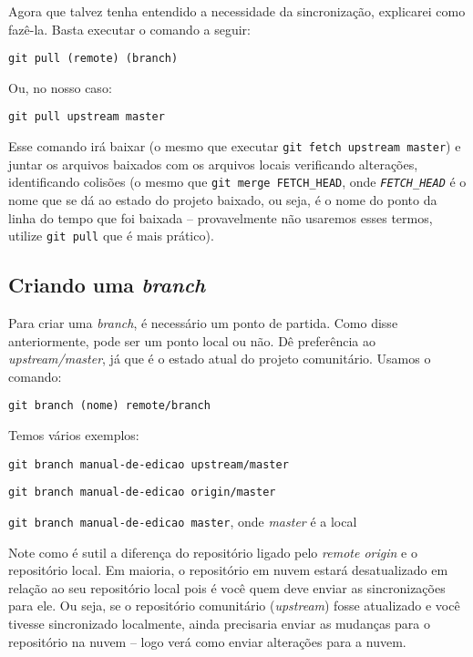 \documentclass[a4paper,oneside,10pt]{memoir}
\begin{document}
Agora que talvez tenha entendido a necessidade da sincronização, explicarei
como fazê-la. Basta executar o comando a seguir:

\begin{center}
\texttt{git pull (remote) (branch)}
\end{center}

Ou, no nosso caso:

\begin{center}
\texttt{git pull upstream master}
\end{center}

Esse comando irá baixar (o mesmo que executar \texttt{git fetch upstream
mas\-ter}) e juntar os arquivos baixados com os arquivos locais verificando
alterações, identificando colisões (o mesmo que \texttt{git merge FETCH\_HEAD},
onde \emph{\texttt{FETCH\_\-HEAD}} é o nome que se dá ao estado do projeto
baixado, ou seja, é o nome do ponto da linha do tempo que foi baixada --
provavelmente não usaremos esses termos, utilize \texttt{git pull} que é mais
prático).

\subsection{Criando uma \emph{branch}}

Para criar uma \emph{branch}, é necessário um ponto de partida. Como disse
anteriormente, pode ser um ponto local ou não. Dê preferência ao
\emph{upstream/master}, já que é o estado atual do projeto comunitário. Usamos
o comando:

\begin{center}
\texttt{git branch (nome) remote/branch}
\end{center}

Temos vários exemplos:

\begin{center}
\texttt{git branch manual-de-edicao upstream/master}

\texttt{git branch manual-de-edicao origin/master}

\texttt{git branch manual-de-edicao master}, onde \emph{master} é a local
\end{center}

Note como é sutil a diferença do repositório ligado pelo \emph{remote origin} e
o repositório local. Em maioria, o repositório em nuvem estará desatualizado em
relação ao seu repositório local pois é você quem deve enviar as sincronizações
para ele. Ou seja, se o repositório comunitário (\emph{upstream}) fosse
atualizado e você tivesse sincronizado localmente, ainda precisaria enviar as
mudanças para o repositório na nuvem -- logo verá como enviar alterações para
a nuvem.
\end{document}
